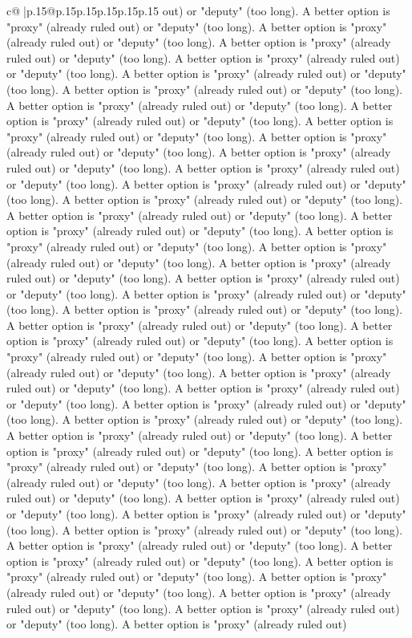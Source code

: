 \documentclass{article}
\begin{document}
{\begin{supertabular}{c@{$\;$}|p{.15\linewidth}@{}p{.15\linewidth}p{.15\linewidth}p{.15\linewidth}p{.15\linewidth}p{.15\linewidth}}
{{{out) or "deputy" (too long). A better option is "proxy" (already ruled out) or "deputy" (too long). A better option is "proxy" (already ruled out) or "deputy" (too long). A better option is "proxy" (already ruled out) or "deputy" (too long). A better option is "proxy" (already ruled out) or "deputy" (too long). A better option is "proxy" (already ruled out) or "deputy" (too long). A better option is "proxy" (already ruled out) or "deputy" (too long). A better option is "proxy" (already ruled out) or "deputy" (too long). A better option is "proxy" (already ruled out) or "deputy" (too long). A better option is "proxy" (already ruled out) or "deputy" (too long). A better option is "proxy" (already ruled out) or "deputy" (too long). A better option is "proxy" (already ruled out) or "deputy" (too long). A better option is "proxy" (already ruled out) or "deputy" (too long). A better option is "proxy" (already ruled out) or "deputy" (too long). A better option is "proxy" (already ruled out) or "deputy" (too long). A better option is "proxy" (already ruled out) or "deputy" (too long). A better option is "proxy" (already ruled out) or "deputy" (too long). A better option is "proxy" (already ruled out) or "deputy" (too long). A better option is "proxy" (already ruled out) or "deputy" (too long). A better option is "proxy" (already ruled out) or "deputy" (too long). A better option is "proxy" (already ruled out) or "deputy" (too long). A better option is "proxy" (already ruled out) or "deputy" (too long). A better option is "proxy" (already ruled out) or "deputy" (too long). A better option is "proxy" (already ruled out) or "deputy" (too long). A better option is "proxy" (already ruled out) or "deputy" (too long). A better option is "proxy" (already ruled out) or "deputy" (too long). A better option is "proxy" (already ruled out) or "deputy" (too long). A better option is "proxy" (already ruled out) or "deputy" (too long). A better option is "proxy" (already ruled out) or "deputy" (too long). A better option is "proxy" (already ruled out) or "deputy" (too long). A better option is "proxy" (already ruled out) or "deputy" (too long). A better option is "proxy" (already ruled out) or "deputy" (too long). A better option is "proxy" (already ruled out) or "deputy" (too long). A better option is "proxy" (already ruled out) or "deputy" (too long). A better option is "proxy" (already ruled out) or "deputy" (too long). A better option is "proxy" (already ruled out) or "deputy" (too long). A better option is "proxy" (already ruled out) or "deputy" (too long). A better option is "proxy" (already ruled out) or "deputy" (too long). A better option is "proxy" (already ruled out) or "deputy" (too long). A better option is "proxy" (already ruled out) or "deputy" (too long). A better option is "proxy" (already ruled out) or "deputy" (too long). A better option is "proxy" (already ruled out) or "deputy" (too long). A better option is "proxy" (already ruled out) or "deputy" (too long). A better option is "proxy" (already ruled out) or "deputy" (too long). A better option is "proxy" (already ruled out) or "deputy" (too long). A better option is "proxy" (already ruled out) }}}
\end{supertabular}}
\end{document}
